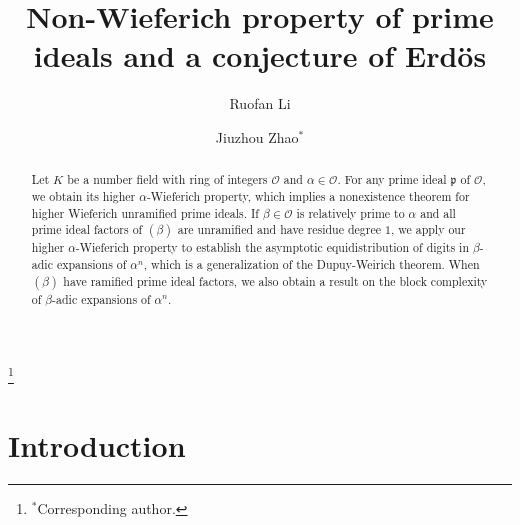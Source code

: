 \documentclass[12pt]{amsart}
\theoremstyle{plain}
\theoremstyle{definition}
\theoremstyle{remark}
\numberwithin{equation}{section}
\begin{document}
	
	\title{Non-Wieferich property of prime ideals and a conjecture of Erd\"os}
	
	
	
	\author{Ruofan Li}
	
	\address{Department of Mathematics, Jinan University, Guangzhou, 510632, China}
	
	
	
	\author{Jiuzhou Zhao$^*$}
	
	\address{School of Mathematics and Statistics, Key Laboratory of Engineering Modeling and Statistical Computation of Hainan Province, Hainan University, Haikou 570228, China}
	
	
	
	
	
	\thanks{$^*$Corresponding author.}
	
	
	
	\begin{abstract}
		Let $K$ be a number field with ring of integers $\mathcal{O}$ and $\alpha\in\mathcal{O}$. For any prime ideal $\mathfrak{p}$ of $\mathcal{O}$, we obtain its higher $\alpha$-Wieferich property, which implies a nonexistence theorem for higher Wieferich unramified prime ideals. If $\beta\in\mathcal{O}$ is relatively prime to $\alpha$ and all prime ideal factors of $(\beta)$ are unramified and have residue degree $1$, we apply our higher $\alpha$-Wieferich property to establish the asymptotic equidistribution of digits in $\beta$-adic expansions of $\alpha^n$, which is a generalization of the Dupuy-Weirich theorem. When $(\beta)$ have ramified prime ideal factors, we also  obtain a result on the block complexity of $\beta$-adic expansions of $\alpha^n$.
	\end{abstract}
	
	\maketitle
	
	\section{Introduction}\label{sc:intro}
\end{document}
